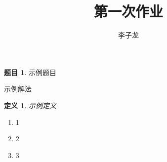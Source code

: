 \documentclass[UTF8,12pt,a4paper]{ctexart}
\author{李子龙}
\makeatletter
\theoremstyle{definition}\newtheorem{problem}{题目}
\theoremstyle{plain}\newtheorem*{solution}{Solution}
\newtheorem{definition}{定义}
\renewenvironment{solution}[1][解] {\par\pushQED{\qed}\normalfont\topsep6\p@\@plus6\p@\relax\trivlist\item[\hskip\labelsep\bfseries#1\@addpunct{.}]\ignorespaces}{\popQED\endtrivlist\@endpefalse}
\makeatother
\begin{document}
    \title{第一次作业}
    \maketitle
    \begin{problem}
        示例题目
    \end{problem}
    \begin{solution}
        示例解法
        \begin{definition}
            示例定义
        \end{definition}
        \begin{enumerate}
            \item 1
            \item 2
            \item 3
        \end{enumerate}
        
    \end{solution}
\end{document}
